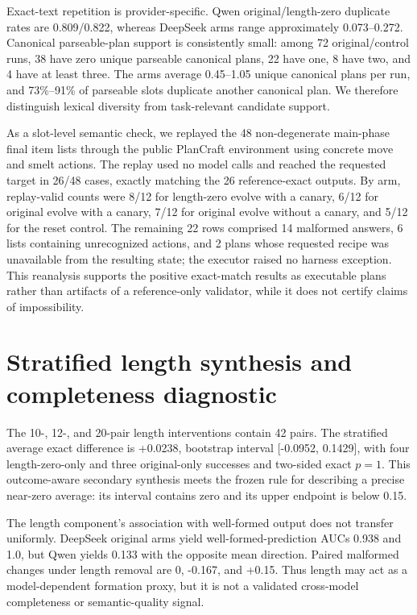 Exact-text repetition is provider-specific. Qwen original/length-zero duplicate rates are 0.809/0.822, whereas DeepSeek arms range approximately 0.073--0.272. Canonical parseable-plan support is consistently small: among 72 original/control runs, 38 have zero unique parseable canonical plans, 22 have one, 8 have two, and 4 have at least three. The arms average 0.45--1.05 unique canonical plans per run, and 73\%--91\% of parseable slots duplicate another canonical plan. We therefore distinguish lexical diversity from task-relevant candidate support.

As a slot-level semantic check, we replayed the 48 non-degenerate main-phase final item lists through the public PlanCraft environment using concrete move and smelt actions. The replay used no model calls and reached the requested target in 26/48 cases, exactly matching the 26 reference-exact outputs. By arm, replay-valid counts were 8/12 for length-zero evolve with a canary, 6/12 for original evolve with a canary, 7/12 for original evolve without a canary, and 5/12 for the reset control. The remaining 22 rows comprised 14 malformed answers, 6 lists containing unrecognized actions, and 2 plans whose requested recipe was unavailable from the resulting state; the executor raised no harness exception. This reanalysis supports the positive exact-match results as executable plans rather than artifacts of a reference-only validator, while it does not certify claims of impossibility.

\section{Stratified length synthesis and completeness diagnostic}

The 10-, 12-, and 20-pair length interventions contain 42 pairs. The stratified average exact difference is +0.0238, bootstrap interval [-0.0952, 0.1429], with four length-zero-only and three original-only successes and two-sided exact \(p=1\). This outcome-aware secondary synthesis meets the frozen rule for describing a precise near-zero average: its interval contains zero and its upper endpoint is below 0.15.

The length component's association with well-formed output does not transfer uniformly. DeepSeek original arms yield well-formed-prediction AUCs 0.938 and 1.0, but Qwen yields 0.133 with the opposite mean direction. Paired malformed changes under length removal are 0, -0.167, and +0.15. Thus length may act as a model-dependent formation proxy, but it is not a validated cross-model completeness or semantic-quality signal.

